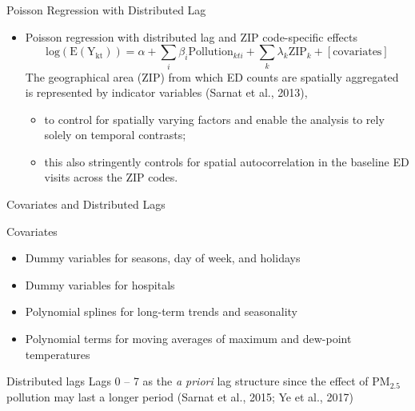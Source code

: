 \documentclass[handout]{beamer} %
\begin{document}
\begin{frame}{Poisson Regression with Distributed Lag}
    \begin{itemize}
        \item Poisson regression with distributed lag and ZIP code-specific effects
            \begin{equation*}
                \mathrm{log(E(Y_{kt}))}=\alpha+\sum_i\beta_i\mathrm{Pollution}_{kti}+\sum_k\lambda_k\mathrm{ZIP}_k+[\mathrm{covariates}]
            \end{equation*}
        \textcolor[rgb]{0.1,0.1,0.6}{The geographical area (ZIP) from which ED counts are spatially aggregated is represented by indicator variables  (Sarnat et al., 2013),}
            \begin{itemize}
                \item \textcolor[rgb]{0.1,0.1,0.6}{to control for spatially varying factors and enable the analysis to rely solely on temporal contrasts;}
                \item \textcolor[rgb]{0.1,0.1,0.6}{this also stringently controls for spatial autocorrelation in the baseline ED visits across the ZIP codes.}
            \end{itemize}
    \end{itemize}
\end{frame}

\begin{frame}{Covariates and Distributed Lags}
    \begin{block}{Covariates}
        \begin{itemize}
            \item Dummy variables for seasons, day of week, and holidays
            \item Dummy variables for hospitals
            \item Polynomial splines for long-term trends and seasonality
            \item Polynomial terms for moving averages of maximum and dew-point temperatures
        \end{itemize}
    \end{block}
    \begin{block}{Distributed lags}
        Lags 0 -- 7 as the \textit{a priori} lag structure since the effect of PM$_{2.5}$ pollution may last a longer period (Sarnat et al., 2015; Ye et al., 2017)
    \end{block}
\end{frame}
\end{document}
